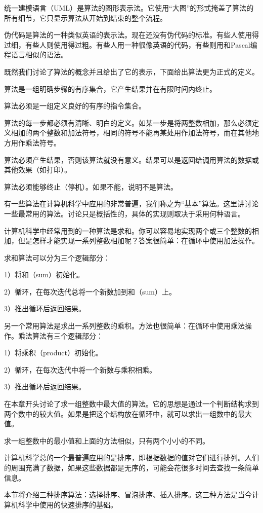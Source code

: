 统一建模语言（UML）是算法的图形表示法。它使用“大图”的形式掩盖了算法的所有细节，它只显示算法从开始到结束的整个流程。

伪代码是算法的一种类似英语的表示法。现在还没有伪代码的标准。有些人使用得过细，有些人则使用得过粗。有些人用一种很像英语的代码，有些则用和Pascal编程语言相似的语法。

既然我们讨论了算法的概念并且给出了它的表示，下面给出算法更为正式的定义。

算法是一组明确步骤的有序集合，它产生结果并在有限时间内终止。

算法必须是一组定义良好的有序的指令集合。

算法的每一步都必须有清晰、明白的定义。如某一步是将两整数相加，那么必须定义相加的两个整数和加法符号，相同的符号不能再某处用作加法符号，而在其他地方用作乘法符号。

算法必须产生结果，否则该算法就没有意义。结果可以是返回给调用算法的数据或其他效果（如打印）。

算法必须能够终止（停机）。如果不能，说明不是算法。

有一些算法在计算机科学中应用的非常普遍，我们称之为“基本”算法。这里讲讨论一些最常用的算法。讨论只是概括性的，具体的实现则取决于采用何种语言。

计算机科学中经常用到的一种算法是求和。你可以容易地实现两个或三个整数的相加，但是怎样才能实现一系列整数相加呢？答案很简单：在循环中使用加法操作。

求和算法可以分为三个逻辑部分：

1）将和（sum）初始化。

2）循环，在每次迭代总将一个新数加到和（sum）上。

3）推出循环后返回结果。

另一个常用算法是求出一系列整数的乘积。方法也很简单：在循环中使用乘法操作。乘法算法有三个逻辑部分：

1）将乘积（product）初始化。

2）循环，在每次迭代中将一个新数与乘积相乘。

3）推出循环后返回结果。

在本章开头讨论了求一组整数中最大值的算法。它的思想是通过一个判断结构求到两个数中的较大值。如果是把这个结构放在循环中，就可以求出一组数中的最大值。

求一组整数中的最小值和上面的方法相似，只有两个小小的不同。

计算机科学总的一个最普遍应用的是排序，即根据数据的值对它们进行排列。人们的周围充满了数据，如果这些数据都是无序的，可能会花很多时间去查找一条简单信息。

本节将介绍三种排序算法：选择排序、冒泡排序、插入排序。这三种方法是当今计算机科学中使用的快速排序的基础。

